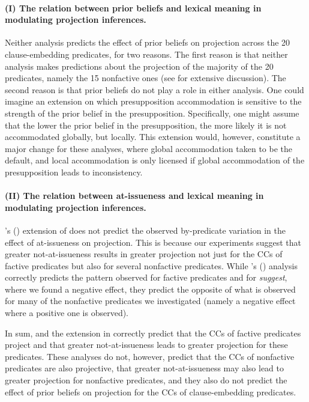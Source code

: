 \documentclass[11pt,fleqn]{article}
\newcommand{\6}{\mbox{$[\hspace*{-.6mm}[$}}
\newcommand{\9}{\mbox{$]\hspace*{-.6mm}]$}}
\newcommand{\citetpos}[1]{\citeauthor{#1}'s (\citeyear{#1})}
\begin{document}
\paragraph{(I) The relation between prior beliefs and lexical meaning in modulating projection inferences.}
Neither analysis predicts the effect of prior beliefs on projection across the 20 clause-embedding predicates, for two reasons. The first reason is that neither analysis makes predictions about the projection of the majority of the 20 predicates, namely the 15 nonfactive ones (see \citealt{degen-tonhauser-language} for extensive discussion). The second reason is that prior beliefs do not play a role in either analysis. One could imagine an extension on which presupposition accommodation is sensitive to the strength of the prior belief in the presupposition. Specifically, one might assume that the lower the prior belief in the presupposition, the more likely it is not accommodated globally, but locally. This extension would, however, constitute a major change for these analyses, where global accommodation taken to be the default, and local accommodation is only licensed if global accommodation of the presupposition leads to inconsistency.

\paragraph{(II) The relation between at-issueness and lexical meaning in modulating projection inferences.} \citetpos{djaerv-bacovcin2020} extension of \cite{heim83} does not predict the observed by-predicate variation in the effect of at-issueness on projection. This is because our experiments suggest that greater not-at-issueness results in greater projection not just for the CCs of factive predicates but also for several nonfactive predicates. While \citetpos{djaerv-bacovcin2020} analysis correctly predicts the pattern observed for factive predicates and for {\em suggest}, where we found a negative effect, they predict the opposite of what is observed for many of the nonfactive predicates we investigated (namely a negative effect where a positive one is observed).

\bigskip

In sum, \cite{heim83} and the extension in \cite{djaerv-bacovcin2020} correctly predict that the CCs of factive predicates project and that greater not-at-issueness leads to greater projection for these predicates. These analyses do not, however, predict that the CCs of nonfactive predicates are also projective, that greater not-at-issueness may also lead to greater projection for nonfactive predicates, and they also do not predict the effect of prior beliefs on projection for the CCs of clause-embedding predicates.
\end{document}
